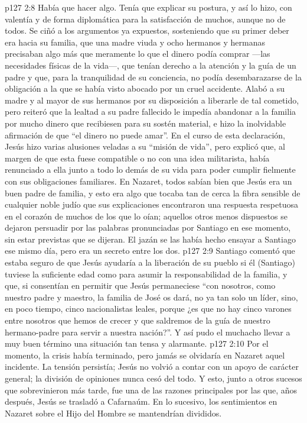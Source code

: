 \vs p127 2:8 Había que hacer algo. Tenía que explicar su postura, y así lo hizo, con valentía y de forma diplomática para la satisfacción de muchos, aunque no de todos. Se ciñó a los argumentos ya expuestos, sosteniendo que su primer deber era hacia su familia, que una madre viuda y ocho hermanos y hermanas precisaban algo más que meramente lo que el dinero podía comprar ---las necesidades físicas de la vida---, que tenían derecho a la atención y la guía de un padre y que, para la tranquilidad de su conciencia, no podía desembarazarse de la obligación a la que se había visto abocado por un cruel accidente. Alabó a su madre y al mayor de sus hermanos por su disposición a liberarle de tal cometido, pero reiteró que la lealtad a su padre fallecido le impedía abandonar a la familia por mucho dinero que recibiesen para su sostén material, e hizo la inolvidable afirmación de que “el dinero no puede amar”. En el curso de esta declaración, Jesús hizo varias alusiones veladas a su “misión de vida”, pero explicó que, al margen de que esta fuese compatible o no con una idea militarista, había renunciado a ella junto a todo lo demás de su vida para poder cumplir fielmente con sus obligaciones familiares. En Nazaret, todos sabían bien que Jesús era un buen padre de familia, y esto era algo que tocaba tan de cerca la fibra sensible de cualquier noble judío que sus explicaciones encontraron una respuesta respetuosa en el corazón de muchos de los que lo oían; aquellos otros menos dispuestos se dejaron persuadir por las palabras pronunciadas por Santiago en ese momento, sin estar previstas que se dijeran. El jazán se las había hecho ensayar a Santiago ese mismo día, pero era un secreto entre los dos.
\vs p127 2:9 Santiago comentó que estaba seguro de que Jesús ayudaría a la liberación de su pueblo si él (Santiago) tuviese la suficiente edad como para asumir la responsabilidad de la familia, y que, si consentían en permitir que Jesús permaneciese “con nosotros, como nuestro padre y maestro, la familia de José os dará, no ya tan solo un líder, sino, en poco tiempo, cinco nacionalistas leales, porque ¿es que no hay cinco varones entre nosotros que hemos de crecer y que saldremos de la guía de nuestro hermano\hyp{}padre para servir a nuestra nación?”. Y así pudo el muchacho llevar a muy buen término una situación tan tensa y alarmante.
\vs p127 2:10 Por el momento, la crisis había terminado, pero jamás se olvidaría en Nazaret aquel incidente. La tensión persistía; Jesús no volvió a contar con un apoyo de carácter general; la división de opiniones nunca cesó del todo. Y esto, junto a otros sucesos que sobrevinieron más tarde, fue una de las razones principales por las que, años después, Jesús se trasladó a Cafarnaúm. En lo sucesivo, los sentimientos en Nazaret sobre el Hijo del Hombre se mantendrían divididos.
